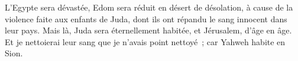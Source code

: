 \begin{multicols}{2}
L'Egypte sera dévastée, Edom sera réduit en désert de désolation, à cause de la violence faite aux enfants de Juda, dont ils ont répandu le sang innocent dans leur pays.
Mais là, Juda sera éternellement habitée, et Jérusalem, d'âge en âge.
Et je nettoierai leur sang que je n'avais point nettoyé~; car Yahweh habite en Sion.
\PPE{}
\end{multicols}
